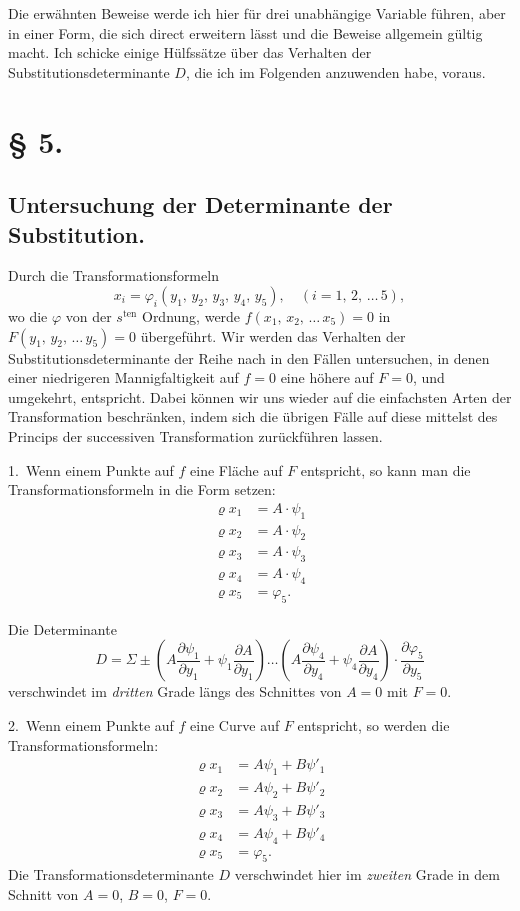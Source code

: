 \documentclass{article}
\begin{document}
Die erwähnten Beweise werde ich hier für drei unabhängige Variable führen, aber in einer Form, die sich direct erweitern lässt und die Beweise allgemein gültig macht. Ich schicke einige Hülfssätze über das Verhalten der Substitutionsdeterminante $D$, die ich im Folgenden anzuwenden habe, voraus.

\section*{§ 5.}

\subsection*{Untersuchung der Determinante der Substitution.}

Durch die Transformationsformeln
\[
x_i = \varphi_i(y_1,\, y_2,\, y_3,\, y_4,\, y_5), \quad (i = 1,\, 2,\, \dots\, 5),
\]
wo die $\varphi$ von der $s^{\text{ten}}$ Ordnung, werde $f(x_1,\, x_2,\, \dots\, x_5) = 0$ in $F(y_1,\, y_2,\, \dots\, y_5) = 0$ übergeführt. Wir werden das Verhalten der Substitutionsdeterminante der Reihe nach in den Fällen untersuchen, in denen einer niedrigeren Mannigfaltigkeit auf $f = 0$ eine höhere auf $F = 0$, und umgekehrt, entspricht. Dabei können wir uns wieder auf die einfachsten Arten der Transformation beschränken, indem sich die übrigen Fälle auf diese mittelst des Princips der successiven Transformation zurückführen lassen.

1.~Wenn einem Punkte auf $f$ eine Fläche auf $F$ entspricht, so kann man die Transformationsformeln in die Form setzen:
\[
\begin{aligned}
\varrho x_1 &= A \cdot \psi_1 \\
\varrho x_2 &= A \cdot \psi_2 \\
\varrho x_3 &= A \cdot \psi_3 \\
\varrho x_4 &= A \cdot \psi_4 \\
\varrho x_5 &= \varphi_5 .
\end{aligned}
\]

Die Determinante
\[
D = \Sigma \pm \left(A \frac{\partial \psi_1}{\partial y_1} + \psi_1 \frac{\partial A}{\partial y_1}\right) \dots \left(A \frac{\partial \psi_4}{\partial y_4} + \psi_4 \frac{\partial A}{\partial y_4}\right) \cdot \frac{\partial \varphi_5}{\partial y_5}
\]
verschwindet im \emph{dritten} Grade längs des Schnittes von $A = 0$ mit $F = 0$.

2.~Wenn einem Punkte auf $f$ eine Curve auf $F$ entspricht, so werden die Transformationsformeln:
\[
\begin{aligned}
\varrho x_1 &= A \psi_1 + B \psi'_1 \\
\varrho x_2 &= A \psi_2 + B \psi'_2 \\
\varrho x_3 &= A \psi_3 + B \psi'_3 \\
\varrho x_4 &= A \psi_4 + B \psi'_4 \\
\varrho x_5 &= \varphi_5 .
\end{aligned}
\]
Die Transformationsdeterminante $D$ verschwindet hier im \emph{zweiten} Grade in dem Schnitt von $A = 0$, $B = 0$, $F = 0$.
\end{document}
